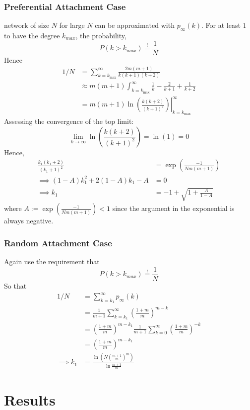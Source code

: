 \documentclass[twoside]{article}
\begin{document}
\subsubsection{Preferential Attachment Case}
network of size $N$ for large $N$ can be approximated with $p_{\infty}(k)$. For at least $1$ to have the degree $k_{max}$, the probability,
\[
P(k>k_{max}) \overset{!}{=} \frac{1}{N}
\]
Hence
\begin{align*}
1/N &= \sum_{k=k_{\text{max}}}^{\infty} \frac{2m(m+1)}{k(k+1)(k+2)} \\
&\approx m(m+1) \int_{k=k_{\text{max}}}^{\infty}  \frac{1}{k} - \frac{2}{k+1} +\frac{1}{k+2} \\
&= m(m+1) \left. \ln \left( \frac{k(k+2)}{(k+1)^2} \right) \right|_{k=k_{\text{max}}}^{\infty} 
\end{align*}
Assessing the convergence of the top limit:
\[
\lim_{k \to \infty} \ln \left( \frac{k(k+2)}{(k+1)^2} \right) = \ln (1) =0
\]
Hence,
\begin{align*}
\frac{k_{1}(k_{1}+2)}{(k_1+1)^2} &= \exp \left( \frac{-1}{Nm(m+1)} \right) \\
\implies (1- A)k_1^2 +2(1-A) k_1 - A&= 0 \\
\implies k_1 &= -1 + \sqrt{1+\frac{A}{1-A}}
\end{align*}
where $A:= \exp \left( \frac{-1}{Nm(m+1)} \right)<1$ since the argument in the exponential is always negative.

\subsubsection{Random Attachment Case}

Again use the requirement that 
\[
P(k>k_{max}) \overset{!}{=} \frac{1}{N}
\]
So that
\begin{align*}
1/N&= \sum_{k=k_1}^{\infty} p_{\infty} (k)\\
&= \frac{1}{m+1} \sum_{k=k_1}^{\infty} \left( \frac{1+m}{m} \right)^{m-k} \\
&= \left( \frac{1+m}{m} \right)^{m-k_1} \frac{1}{m+1} \sum_{k=0}^{\infty} \left( \frac{1+m}{m} \right)^{-k}\\
&= \left( \frac{1+m}{m} \right)^{m-k_1}\\
\implies k_1 &= \frac{\ln \left( N \left( \frac{m+1}{m} \right)^m \right)}{\ln \frac{m+1}{m}}
\end{align*}


\section{Results}
\end{document}
